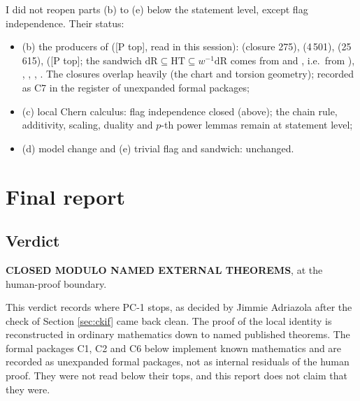 \documentclass[11pt]{article}
\newcommand{\mPt}{\textsf{[P top]}}
\theoremstyle{remark}
\begin{document}
I did not reopen parts (b) to (e) below the statement level, except flag independence. Their status:
\begin{itemize}[nosep]
\item (b) the producers of  (\mPt, read in this session):  (closure 275),  (4\,501),  (25\,615),  (\mPt; the sandwich $\mathrm{dR}\subseteq\mathrm{HT}\subseteq w^{-1}\mathrm{dR}$ comes from  and , i.e.\ from ), , , , . The closures overlap heavily (the chart and torsion geometry); recorded as C7 in the register of unexpanded formal packages;
\item (c) local Chern calculus: flag independence closed (above); the chain rule, additivity, scaling, duality and $p$-th power lemmas remain at statement level;
\item (d) model change and (e) trivial flag and sandwich: unchanged.
\end{itemize}

\section{Final report}\label{sec:final}

\subsection*{Verdict}
\textbf{CLOSED MODULO NAMED EXTERNAL THEOREMS}, at the human-proof boundary.

This verdict records where PC-1 stops, as decided by Jimmie Adriazola after the  check of Section \ref{sec:ckif} came back clean. The proof of the local identity is reconstructed in ordinary mathematics down to named published theorems. The formal packages C1, C2 and C6 below implement known mathematics and are recorded as unexpanded formal packages, not as internal residuals of the human proof. They were not read below their tops, and this report does not claim that they were.
\end{document}
